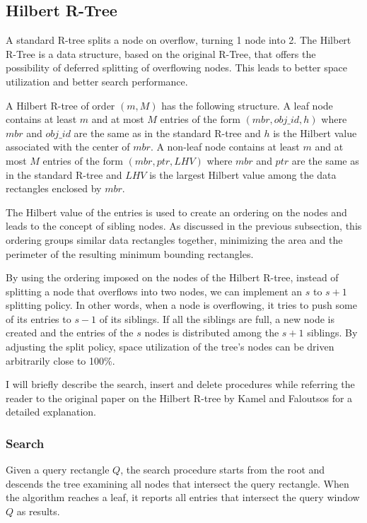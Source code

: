 \documentclass[11pt, a4paper, oneside]{article}
\begin{document}
\subsection{Hilbert R-Tree}
A standard R-tree splits a node on overflow, turning 1 node into 2. The Hilbert R-Tree is a data structure, based on the original R-Tree, that offers the possibility of deferred splitting of overflowing nodes. This leads to better space utilization and better search performance.

A Hilbert R-tree of order $(m,M)$ has the following structure. A leaf node contains at least $m$ and at most $M$ entries of the form $(mbr, obj\_id, h)$ where $mbr$ and $obj\_id$ are the same as in the standard R-tree and $h$ is the Hilbert value associated with the center of $mbr$. A non-leaf node contains at least $m$ and at most $M$ entries of the form $(mbr, ptr, LHV)$ where $mbr$ and $ptr$ are the same as in the standard R-tree and $LHV$ is the largest Hilbert value among the data rectangles enclosed by $mbr$.

The Hilbert value of the entries is used to create an ordering on the nodes and leads to the concept of sibling nodes. As discussed in the previous subsection, this ordering groups similar data rectangles together, minimizing the area and the perimeter of the resulting minimum bounding rectangles.

By using the ordering imposed on the nodes of the Hilbert R-tree, instead of splitting a node that overflows into two nodes, we can implement an $s$ to $s+1$ splitting policy. In other words, when a node is overflowing, it tries to push some of its entries to $s-1$ of its siblings. If all the siblings are full, a new node is created and the entries of the $s$ nodes is distributed among the $s+1$ siblings. By adjusting the split policy, space utilization of the tree's nodes can be driven arbitrarily close to 100\%.

I will briefly describe the search, insert and delete procedures while referring the reader to the original paper on the Hilbert R-tree by Kamel and Faloutsos \cite{Kamel:1994:HRI:645920.673001} for a detailed explanation.

\subsubsection*{Search}
Given a query rectangle $Q$, the search procedure starts from the root and descends the tree examining all nodes that intersect the query rectangle. When the algorithm reaches a leaf, it reports all entries that intersect the query window $Q$ as results.
\end{document}

